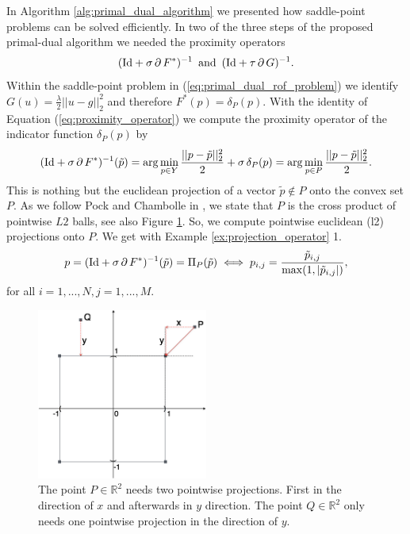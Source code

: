 \documentclass[abstracton]{scrreprt}
\begin{document}
            In Algorithm \ref{alg:primal_dual_algorithm} we presented how saddle-point problems can be solved efficiently. In two of the three steps of the proposed primal-dual algorithm we needed the proximity operators
                $$
                    (\textnormal{Id} + \sigma\,\partial\,F^{\ast})^{-1} \,\,\, \textnormal{and} \,\,\, (\textnormal{Id} + \tau\,\partial\,G)^{-1}.
                $$
            Within the saddle-point problem in (\ref{eq:primal_dual_rof_problem}) we identify $G(u) = \frac{\lambda}{2} ||u - g||_{2}^{2}$ and therefore $F^{\ast}(p) = \delta_{P}(p)$. With the identity of Equation (\ref{eq:proximity_operator}) we compute the proximity operator of the indicator function $\delta_{P}(p)$ by
                $$
                    (\textnormal{Id} + \sigma\,\partial\,F^{\ast})^{-1}(\tilde{p}) = \arg \min_{p \in Y} \frac{||p - \tilde{p}||_{2}^{2}}{2} + \sigma\,\delta_{P}(p) = \arg \min_{p \in P} \frac{||p - \tilde{p}||_{2}^{2}}{2}.
                $$
            This is nothing but the euclidean projection of a vector $\tilde{p} \notin P$ onto the convex set $P$. As we follow Pock and Chambolle in \cite{Chambolle10afirst-order}, we state that $P$ is the cross product of pointwise $L2$ balls, see also Figure \ref{fig:pointwise_l2_projections}. So, we compute pointwise euclidean (l2) projections onto $P$. We get with Example \ref{ex:projection_operator} 1.
                $$
                    p = (\textnormal{Id} + \sigma\,\partial\,F^{\ast})^{-1}(\tilde{p}) = \Pi_{P}(\tilde{p}) \iff p_{i,j} = \frac{\tilde{p}_{i, j}}{\max(1, |\tilde{p}_{i, j}|)},
                $$
            for all $i = 1, ..., N, j = 1, ..., M$.
            \begin{figure}[!ht]
                \centering
                \includegraphics[width=0.5\textwidth]{img/pointwise_projection.png}
                \caption[Pointwise $l2$ projections.]{The point $P \in \mathbb{R}^{2}$ needs two pointwise projections. First in the direction of $x$ and afterwards in $y$ direction. The point $Q \in \mathbb{R}^{2}$ only needs one pointwise projection in the direction of $y$.}
                \label{fig:pointwise_l2_projections}
            \end{figure}
\end{document}
